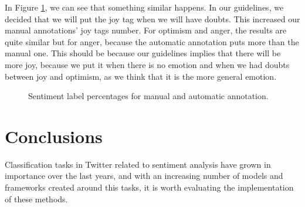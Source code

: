 \documentclass[11pt,a4paper]{article}
\begin{document}
In Figure \ref{fig:pieplots_emotion}, we can see that something similar happens. In our guidelines, we decided that we will put the joy tag when we will have doubts. This increased our manual annotations' joy tags number. For optimism and anger, the results are quite similar but for anger, because the automatic annotation puts more than the manual one. This should be because our guidelines implies that there will be more joy, because we put it when there is no emotion and when we had doubts between joy and optimism, as we think that it is the more general emotion. 

\begin{figure}[ht]
    \centering
    \caption{Sentiment label percentages for manual and automatic annotation.}
    \label{fig:pieplots_emotion}
\end{figure}

\section{Conclusions}

Classification tasks in Twitter related to sentiment analysis have grown in importance over the last years, and with an increasing number of models and frameworks created around this tasks, it is worth evaluating the implementation of these methods. 
\end{document}
